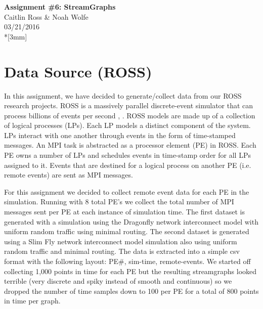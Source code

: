 \documentclass[12pt]{article}
\begin{document}
\thispagestyle{empty}
\begin{center}
{\Large\bf Assignment \#6: StreamGraphs}
\vspace{3mm}
\\Caitlin Ross \& Noah Wolfe
\\03/21/2016
\\*[3mm]
\end{center}
\section{Data Source (ROSS)}
In this assignment, we have decided to generate/collect data from our ROSS research projects. 
ROSS is a massively parallel discrete-event simulator that
can process billions of events per second \cite{Holder}, \cite{Bauer}. ROSS
models are made up of a collection of logical processes (LPs).
Each LP models a distinct component of the system. LPs
interact with one another through events in the form of time-stamped messages. An MPI task is abstracted as a processor
element (PE) in ROSS. Each PE owns a number of LPs and
schedules events in time-stamp order for all LPs assigned to
it. Events that are destined for a logical process on another
PE (i.e. remote events) are sent as MPI messages. 

For this assignment we decided to collect remote event data for each PE in the simulation. Running with 8 total PE's we collect the total number of MPI messages sent per PE at each instance of simulation time. The first dataset is generated with a simulation using the Dragonfly network interconnect model with uniform random traffic using minimal routing. The second dataset is generated using a Slim Fly network interconnect model simulation also using uniform random traffic and minimal routing. The data is extracted into a simple csv format with the following layout: PE\#, sim-time, remote-events. We started off collecting 1,000 points in time for each PE but the resulting streamgraphs looked terrible (very discrete and spiky instead of smooth and continuous) so we dropped the number of time samples down to 100 per PE for a total of 800 points in time per graph.
\end{document}
